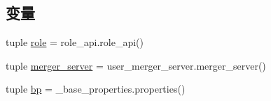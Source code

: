 \subsection*{变量}
\begin{DoxyCompactItemize}
\item 
tuple \hyperlink{namespaceapi_1_1sys_a4fb3f8082d5b5ac55d673ef010c14651}{role} = role\-\_\-api.\-role\-\_\-api()
\item 
tuple \hyperlink{namespaceapi_1_1sys_a35dfffc39f2bccc0e01df7507dd2e632}{merger\-\_\-server} = user\-\_\-merger\-\_\-server.\-merger\-\_\-server()
\item 
tuple \hyperlink{namespaceapi_1_1sys_a669f331c595e524207724ec55d268bfe}{bp} = \-\_\-base\-\_\-properties.\-properties()
\end{DoxyCompactItemize}


